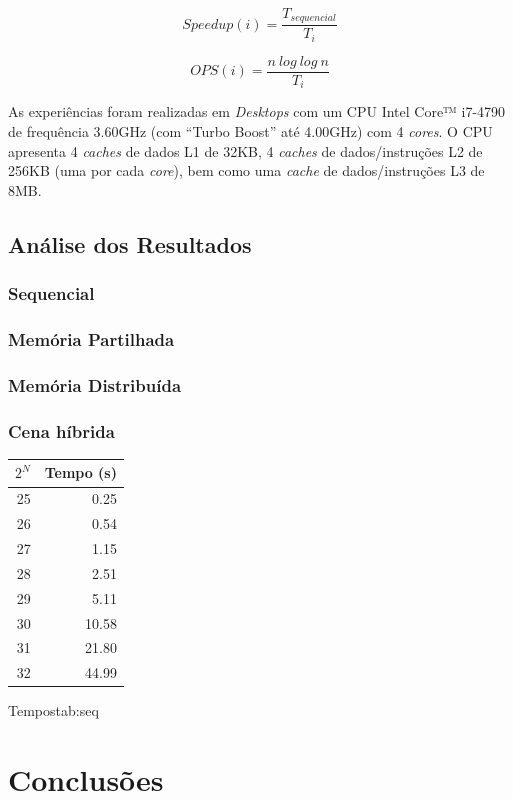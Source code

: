 \documentclass[a4paper]{article}
\begin{document}
\begin{equation}
Speedup(i) = \frac{T_{sequencial}}{T_i}
\end{equation}
 
\begin{equation}
OPS(i) = \frac{n\ log\ log\ n}{T_i}
\end{equation}
 
As experiências foram realizadas em \textit{Desktops} com um CPU Intel Core™ i7-4790 de frequência 3.60GHz (com ``Turbo Boost'' até 4.00GHz) com 4 \textit{cores}. O CPU apresenta 4 \textit{caches} de dados L1 de 32KB, 4 \textit{caches} de dados/instruções L2 de 256KB (uma por cada \textit{core}), bem como uma \textit{cache} de dados/instruções L3 de 8MB.
 
\subsection{Análise dos Resultados}
 
\subsubsection{Sequencial}
 
\subsubsection{Memória Partilhada}
 
\subsubsection{Memória Distribuída}
 
\subsubsection{Cena híbrida}
 
{
    \begin{tabular}{@{}rr@{}}
    \toprule
    \multicolumn{1}{l}{$2^N$} & \multicolumn{1}{l}{Tempo (s)} \\ \midrule
    25 & 0.25 \\
    26 & 0.54 \\
    27 & 1.15 \\
    28 & 2.51 \\
    29 & 5.11 \\
    30 & 10.58 \\
    31 & 21.80 \\
    32 & 44.99 \\ \bottomrule
    \end{tabular}
}{Tempos}{tab:seq}
 
 
\section{Conclusões}
 
 
\printbibliography
 
\end{document}
